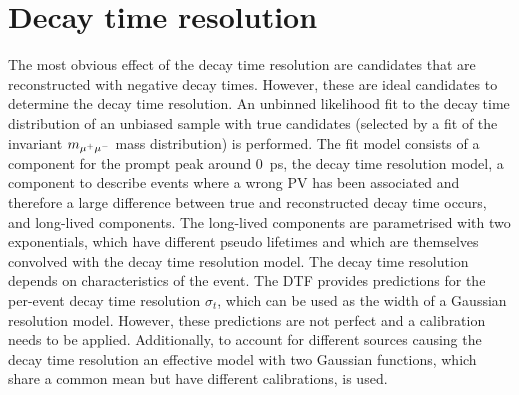 \section{Decay time resolution}
\label{sec:bd2jpsiks:decaytime:resolution}

The most obvious effect of the decay time resolution are candidates that are
reconstructed with negative decay times. However, these are ideal candidates
to determine the decay time resolution. An unbinned likelihood fit to the
decay time distribution of an unbiased \BdToJPsiKS sample with true \JPsi
candidates (selected by a fit of the invariant $m_{{\mu^+\mu^-}}$ mass distribution)
is performed. The fit model consists of a component for the prompt peak around
\SI{0}{\ps}, \ie the decay time resolution model, a component to describe
events where a wrong PV has been associated and therefore a large difference
between true and reconstructed decay time occurs, and long-lived components.
The long-lived components are parametrised with two exponentials, which have
different pseudo lifetimes and which are themselves convolved with the decay
time resolution model. The decay time resolution depends on characteristics of
the event. The DTF provides predictions for the per-event decay time
resolution $\sigma_t$, which can be used as the width of a Gaussian resolution
model. However, these predictions are not perfect and a calibration needs to
be applied. Additionally, to account for different sources causing the decay
time resolution an effective model with two Gaussian functions, which share a
common mean but have different calibrations, is used.

